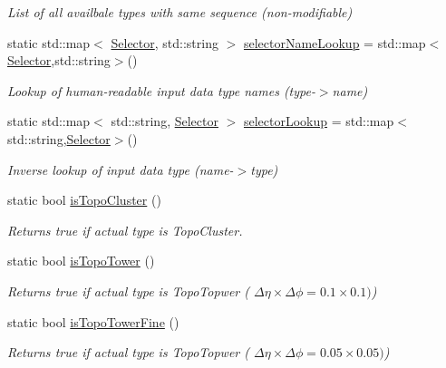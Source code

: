 \begin{DoxyCompactItemize}
\begin{DoxyCompactList}\small\item\em List of all availbale types with same sequence (non-\/modifiable) \end{DoxyCompactList}\item 
static std\+::map$<$ \hyperlink{namespaceAnalysis_1_1Config_1_1Input_a4fbe1ba2d37856e6b9784b4999d5268a}{Selector}, std\+::string $>$ \hyperlink{namespaceAnalysis_1_1Config_1_1Input_a3464419de97f63c4c1740c3fde0deff0}{selector\+Name\+Lookup} = std\+::map$<$\hyperlink{namespaceAnalysis_1_1Config_1_1Input_a4fbe1ba2d37856e6b9784b4999d5268a}{Selector},std\+::string$>$()
\begin{DoxyCompactList}\small\item\em Lookup of human-\/readable input data type names (type-\/$>$name) \end{DoxyCompactList}\item 
static std\+::map$<$ std\+::string, \hyperlink{namespaceAnalysis_1_1Config_1_1Input_a4fbe1ba2d37856e6b9784b4999d5268a}{Selector} $>$ \hyperlink{namespaceAnalysis_1_1Config_1_1Input_ab48a0d60ba640c5a21e979d16e58115c}{selector\+Lookup} = std\+::map$<$std\+::string,\hyperlink{namespaceAnalysis_1_1Config_1_1Input_a4fbe1ba2d37856e6b9784b4999d5268a}{Selector}$>$()
\begin{DoxyCompactList}\small\item\em Inverse lookup of input data type (name-\/$>$type) \end{DoxyCompactList}\item 
static bool \hyperlink{namespaceAnalysis_1_1Config_1_1Input_af64e34d8da610aae7d8e1af4f21e092e}{is\+Topo\+Cluster} ()
\begin{DoxyCompactList}\small\item\em Returns {\ttfamily true} if actual type is {\ttfamily Topo\+Cluster}. \end{DoxyCompactList}\item 
static bool \hyperlink{namespaceAnalysis_1_1Config_1_1Input_a8e48910b447b8c7667f8bcac33850d41}{is\+Topo\+Tower} ()
\begin{DoxyCompactList}\small\item\em Returns {\ttfamily true} if actual type is {\ttfamily Topo\+Topwer} ( $ \Delta\eta\times\Delta\phi = 0.1\times 0.1) $) \end{DoxyCompactList}\item 
static bool \hyperlink{namespaceAnalysis_1_1Config_1_1Input_ad8bc3f4c2a336a8776a1ebe56aaa3b7c}{is\+Topo\+Tower\+Fine} ()
\begin{DoxyCompactList}\small\item\em Returns {\ttfamily true} if actual type is {\ttfamily Topo\+Topwer} ( $ \Delta\eta\times\Delta\phi = 0.05\times 0.05) $) \end{DoxyCompactList}\item 

\end{DoxyCompactItemize}
